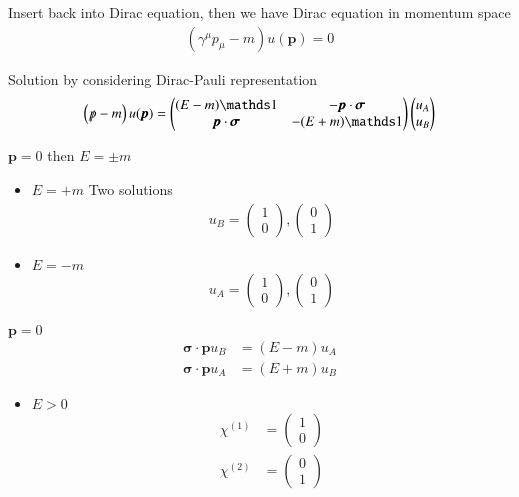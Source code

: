 Insert back into Dirac equation, then we have Dirac equation in momentum space
\begin{align}
   \left( \gamma^\mu p_\mu - m \right) u(\pmb{p}) = 0
\end{align}

Solution by considering Dirac-Pauli representation
\begin{align*}
   \left( \slashed{p} - m \right) u(\pmb{p}) = \begin{pmatrix} (E-m) \id & - \pmb{p} \cdot \pmb{\sigma} \\ \pmb{p} \cdot \pmb{\sigma} & -(E+m) \id \end{pmatrix} 
   \begin{pmatrix} u_A \\ u_B\end{pmatrix}
\end{align*}

$\pmb{p} = 0$ then $E = \pm m$

\begin{itemize}
   \item $E = +m$ Two solutions 
      \begin{align*}
         u_B = \begin{pmatrix} 1 \\ 0 \end{pmatrix} , \begin{pmatrix} 0 \\ 1\end{pmatrix}
      \end{align*}

   \item $E=-m$
      \begin{align*}
         u_A = \begin{pmatrix} 1 \\ 0\end{pmatrix}, \begin{pmatrix} 0 \\ 1\end{pmatrix}
      \end{align*}
\end{itemize}

$\pmb{p} = 0$
\begin{align}
   \pmb{\sigma} \cdot \pmb{p} u_B &= (E-m) u_A \\
   \pmb{\sigma} \cdot \pmb{p} u_A &= (E+m) u_B
\end{align}

\begin{itemize}
   \item $E>0$ 
      \begin{align*}
         \chi^{(1)} &= \begin{pmatrix} 1 \\ 0\end{pmatrix} \\
         \chi^{(2)} &= \begin{pmatrix} 0 \\ 1\end{pmatrix}
      \end{align*}
\end{itemize}

